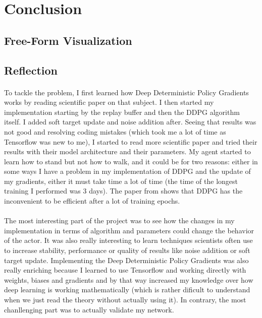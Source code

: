 \documentclass{article}
\begin{document}
\newpage
\section{Conclusion}

\subsection{Free-Form Visualization}

\subsection{Reflection}

\paragraph{}
To tackle the problem, I first learned how Deep Deterministic Policy Gradients works by reading
scientific paper on that subject. I then started my implementation starting by the replay buffer
and then the DDPG algorithm itself. I added soft target update and noise addition after. Seeing
that results was not good and resolving coding mistakes (which took me a lot of time as Tensorflow
was new to me), I started to read more scientific paper and tried their results with their model
architecture and their parameters. My agent started to learn how to
stand but not how to walk, and it could be for two reasons: either in some ways
I have a problem in my implementation of DDPG and the update of my gradients,
either it must take time a lot of time (the time of the longest training I
performed was 3 days). The paper from
\citeauthor{journals/corr/LillicrapHPHETS15} shows that DDPG has the
inconvenient to be efficient after a lot of training epochs. 


\paragraph{}
The most interesting part of the project was to see how the changes in my implementation in terms
of algorithm and parameters could change the behavior of the actor. It was also really interesting
to learn techniques scientists often use to increase stability, performance or quality of results
like noise addition or soft target update. Implementing the Deep Deterministic Policy Gradients
was also really enriching because I learned to use Tensorflow and working directly with weights,
biases and gradients and by that way increased my knowledge over how deep learning is working
mathematically (which is rather dificult to understand when we just read the theory without
actually using it). In contrary, the most chanllenging part was to actually validate my network. 
\end{document}
